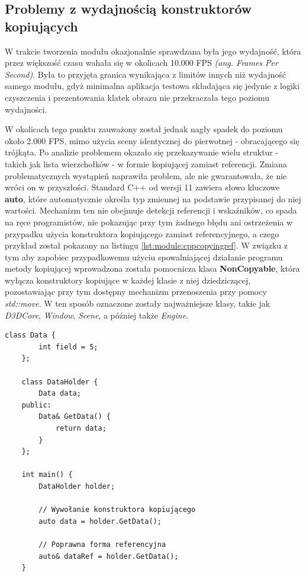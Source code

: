 \subsection{Problemy z wydajnością konstruktorów kopiujących}
W trakcie tworzenia modułu okazjonalnie sprawdzana była jego wydajność, która przez większość czasu wahała się w okolicach 10.000 FPS \textit{(ang. Frames Per Second)}. Była to przyjęta granica wynikająca z limitów innych niż wydajność samego modułu, gdyż minimalna aplikacja testowa składająca się jedynie z logiki czyszczenia i prezentowania klatek obrazu nie przekraczała tego poziomu wydajności. 

W okolicach tego punktu zauważony został jednak nagły spadek do poziomu około 2.000 FPS, mimo użycia sceny identycznej do pierwotnej - obracającego się trójkąta. Po analizie problemem okazało się przekazywanie wielu struktur - takich jak lista wierzchołków - w formie kopiującej zamiast referencji. Zmiana problematycznych wystąpień naprawiła problem, ale nie gwarantowała, że nie wróci on w przyszłości. Standard C++ od wersji 11 zawiera słowo kluczowe \textbf{auto}, które automatycznie określa typ zmiennej na podstawie przypisanej do niej wartości. Mechanizm ten nie obejmuje detekcji referencji i wskaźników, co spada na ręce programistów, nie pokazując przy tym żadnego błędu ani ostrzeżenia w przypadku użycia konstruktora kopiującego zamiast referencyjnego, a czego przykład został pokazany na listingu \ref{lst:module:cppcopyingref}. W związku z tym aby zapobiec przypadkowemu użyciu spowalniającej działanie programu metody kopiującej wprowadzona została pomocnicza klasa \textbf{NonCopyable}, która wyłącza konstruktory kopiujące w każdej klasie z niej dziedziczącej, pozostawiając przy tym dostępny mechanizm przenoszenia przy pomocy \textit{std::move}. W ten sposób oznaczone zostały najważniejsze klasy, takie jak \textit{D3DCore}, \textit{Window}, \textit{Scene}, a później także \textit{Engine}. 

\vfill

\begin{lstlisting}[caption={Przykład sytuacji, w której łatwym jest użycie formy kopiującej zamiast referencji, co skutkuje dużym kosztem wydajnościowym.}, label={lst:module:cppcopyingref}]
	class Data {
		int field = 5;
	};
	
	class DataHolder {
		Data data;	
	public:
		Data& GetData() {
			return data;
		}
	};

	int main() {
		DataHolder holder;

		// Wywołanie konstruktora kopiującego
		auto data = holder.GetData();

		// Poprawna forma referencyjna
		auto& dataRef = holder.GetData();
	}	
\end{lstlisting}

